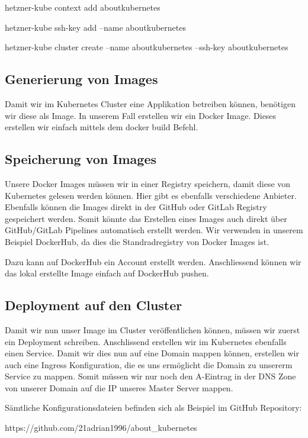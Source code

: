 hetzner-kube context add aboutkubernetes

hetzner-kube ssh-key add --name aboutkubernetes  

hetzner-kube cluster create --name aboutkubernetes --ssh-key aboutkubernetes

\subsection{Generierung von Images}
Damit wir im Kubernetes Cluster eine Applikation betreiben können, benötigen wir diese als Image. In unserem Fall erstellen wir ein Docker Image. 
Dieses erstellen wir einfach mittels dem docker build Befehl.

\subsection{Speicherung von Images}
Unsere Docker Images müssen wir in einer Registry speichern, damit diese von Kubernetes gelesen werden können. Hier gibt es ebenfalls verschiedene Anbieter. Ebenfalls können die Images direkt in der GitHub oder GitLab Registry gespeichert werden.
Somit könnte das Erstellen eines Images auch direkt über GitHub/GitLab Pipelines automatisch erstellt werden.
Wir verwenden in unserem Beispiel DockerHub, da dies die Standradregistry von Docker Images ist.

Dazu kann auf DockerHub ein Account erstellt werden. Anschliessend können wir das lokal erstellte Image einfach auf DockerHub pushen.

\subsection{Deployment auf den Cluster}
Damit wir nun unser Image im Cluster veröffentlichen können, müssen wir zuerst ein Deployment schreiben. Anschlissend erstellen wir im Kubernetes ebenfalls einen Service. Damit wir dies nun auf eine Domain mappen können, erstellen wir auch eine Ingress Konfiguration, die es uns ermöglicht die Domain zu unsererm Service zu mappen.
Somit müssen wir nur noch den A-Eintrag in der DNS Zone von unserer Domain auf die IP unseres Master Server mappen.


Sämtliche Konfigurationsdateien befinden sich als Beispiel im GitHub Repository:

https://github.com/21adrian1996/about\_kubernetes
\clearpage